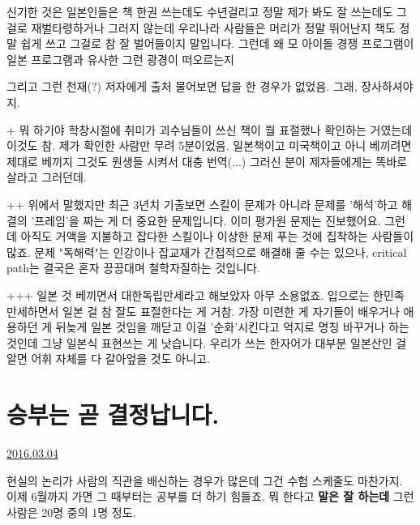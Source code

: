신기한 것은
일본인들은 책 한권 쓰는데도 수년걸리고 정말 제가 봐도 잘 쓰는데도 그걸로 재벌타령하거나 그러지 않는데
우리나라 사람들은 머리가 정말 뛰어난지 책도 정말 쉽게 쓰고 그걸로 참 잘 벌어들이지 말입니다.
그런데 왜 모 아이돌 경쟁 프로그램이 일본 프로그램과 유사한 그런 광경이 떠오르는지
\vspace{5mm}

그리고 그런 천재(?) 저자에게 출처 물어보면 답을 한 경우가 없었음. 그래, 장사하셔야지.
\vspace{5mm}

+
뭐 하기야 학창시절에 취미가 괴수님들이 쓰신 책이 뭘 표절했나 확인하는 거였는데 이것도 참.
제가 확인한 사람만 무려 5분이었음. 일본책이고 미국책이고 아니 베끼려면 제대로 베끼지 그것도 원생들 시켜서 대충 번역(...)
그러신 분이 제자들에게는 똑바로 살라고 그러던데.
\vspace{5mm}

++
위에서 말했지만 최근 3년치 기출보면 스킬이 문제가 아니라 문제를 '해석'하고 해결의 '프레임'을 짜는 게 더 중요한 문제입니다.
이미 평가원 문제는 진보했어요. 그런데 아직도 거액을 지불하고 잡다한 스킬이나 이상한 문제 푸는 것에 집착하는 사람들이 많죠.
문제 "독해력"는 인강이나 잡교재가 간접적으로 해결해 줄 수는 있으나, critical path는 결국은 혼자 끙끙대며 철학자질하는 것입니다.
\vspace{5mm}

+++
일본 것 베끼면서 대한독립만세라고 해보았자 아무 소용없죠. 입으로는 한민족 만세하면서 일본 걸 참 잘도 표절한다는 게 거참.
가장 미련한 게 자기들이 배우거나 애용하던 게 뒤늦게 일본 것임을 깨닫고 이걸 '순화'시킨다고 억지로 명칭 바꾸거나 하는 것인데
그냥 일본식 표현쓰는 게 낫습니다. 우리가 쓰는 한자어가 대부분 일본산인 걸 알면 어휘 자체를 다 갈아엎을 것도 아니고.
\vspace{5mm}






\section{승부는 곧 결정납니다.}
\href{https://www.kockoc.com/Apoc/662562}{2016.03.04}

\vspace{5mm}

현실의 논리가 사람의 직관을 배신하는 경우가 많은데 그건 수험 스케줄도 마찬가지.
이제 6월까지 가면 그 때부터는 공부를 더 하기 힘들죠. 뭐 한다고 \textbf{말은 잘 하는데} 그런 사람은 20명 중의 1명 정도.
\vspace{5mm}

